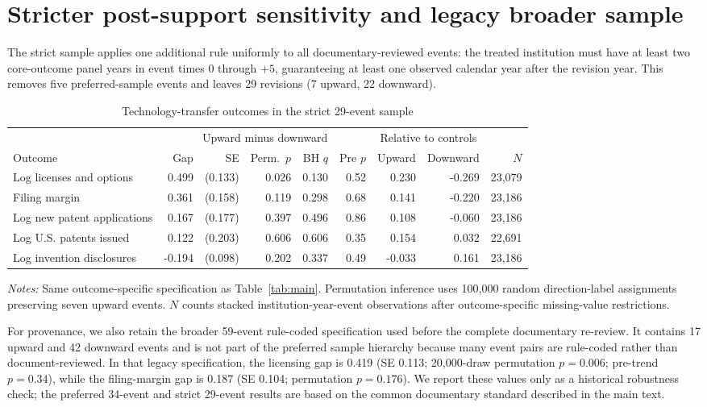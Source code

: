 \section{Stricter post-support sensitivity and legacy broader sample}\label{app:strict}

The strict sample applies one additional rule uniformly to all documentary-reviewed events: the treated institution must have at least two core-outcome panel years in event times 0 through $+5$, guaranteeing at least one observed calendar year after the revision year. This removes five preferred-sample events and leaves 29 revisions (7 upward, 22 downward).

\begin{table}[htbp]\centering
\caption{Technology-transfer outcomes in the strict 29-event sample}\label{tab:strict}
\begin{threeparttable}\footnotesize\setlength{\tabcolsep}{4pt}
\begin{tabular}{lrrrrrrrr}\toprule
 & \multicolumn{5}{c}{Upward minus downward} & \multicolumn{2}{c}{Relative to controls} & \\\cmidrule(lr){2-6}\cmidrule(lr){7-8}
Outcome & Gap & SE & Perm.\ $p$ & BH $q$ & Pre $p$ & Upward & Downward & $N$ \\\midrule
Log licenses and options & 0.499 & (0.133) & 0.026 & 0.130 & 0.52 & 0.230 & -0.269 & 23,079 \\
Filing margin & 0.361 & (0.158) & 0.119 & 0.298 & 0.68 & 0.141 & -0.220 & 23,186 \\
Log new patent applications & 0.167 & (0.177) & 0.397 & 0.496 & 0.86 & 0.108 & -0.060 & 23,186 \\
Log U.S. patents issued & 0.122 & (0.203) & 0.606 & 0.606 & 0.35 & 0.154 & 0.032 & 22,691 \\
Log invention disclosures & -0.194 & (0.098) & 0.202 & 0.337 & 0.49 & -0.033 & 0.161 & 23,186 \\
\bottomrule
\end{tabular}
\begin{tablenotes}[flushleft]\footnotesize
\item \textit{Notes:} Same outcome-specific specification as Table~\ref{tab:main}. Permutation inference uses 100,000 random direction-label assignments preserving seven upward events. $N$ counts stacked institution-year-event observations after outcome-specific missing-value restrictions.
\end{tablenotes}
\end{threeparttable}
\end{table}

For provenance, we also retain the broader 59-event rule-coded specification used before the complete documentary re-review. It contains 17 upward and 42 downward events and is not part of the preferred sample hierarchy because many event pairs are rule-coded rather than document-reviewed. In that legacy specification, the licensing gap is 0.419 (SE 0.113; 20,000-draw permutation $p=0.006$; pre-trend $p=0.34$), while the filing-margin gap is 0.187 (SE 0.104; permutation $p=0.176$). We report these values only as a historical robustness check; the preferred 34-event and strict 29-event results are based on the common documentary standard described in the main text.
